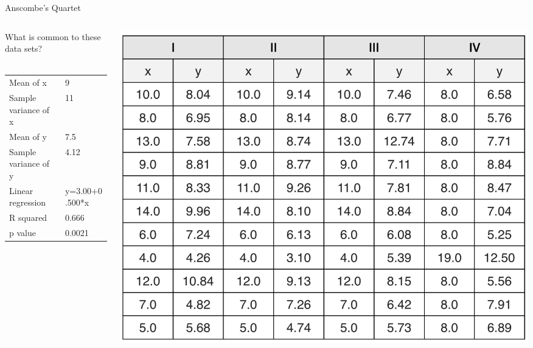 \documentclass[10pt,aspectratio=169]{beamer}
\begin{document}
\begin{frame}{Anscombe's Quartet}
  \begin{columns}
    \begin{column}{.5\textwidth}    
      What is common to these data sets?\\
      ~\\
      \begin{tabular}{ll}
        Mean of x            & 9\\
        Sample variance of x & 11\\
        Mean of y            & 7.5\\
        Sample variance of y & 4.12\\
        Linear regression    & y=3.00+0.500*x\\
        R squared            & 0.666\\
        p value              & 0.0021\\
      \end{tabular}

    \end{column}
    \begin{column}{.5\textwidth}
      \includegraphics[width=.85\textwidth]{Anscombe-tables.png}
    \end{column}
  \end{columns}

\end{frame}
\end{document}
